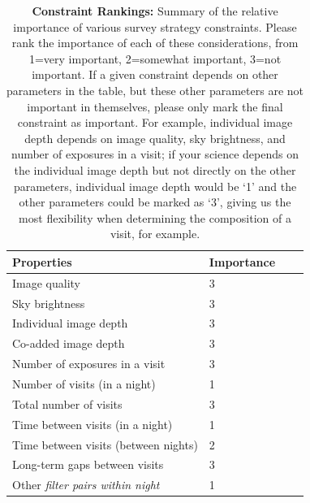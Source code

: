 \documentclass[12pt, letterpaper]{article}
\begin{document}
\begin{table}[ht]
    \centering
    \begin{tabular}{l|l|l|l}
        \toprule
        Properties & Importance \hspace{.3in} \\
        \midrule
        Image quality &   3  \\
        Sky brightness &  3\\
        Individual image depth & 3  \\
        Co-added image depth &   3\\
        Number of exposures in a visit   &  3 \\
        Number of visits (in a night)  &  1 \\ 
        Total number of visits &   3\\
        Time between visits (in a night) & 1 \\
        Time between visits (between nights)  & 2  \\
        Long-term gaps between visits & 3\\
        Other \emph{filter pairs within night} & 1 \\
        \bottomrule
    \end{tabular}
    \caption{{\bf Constraint Rankings:} Summary of the relative importance of various survey strategy constraints. Please rank the importance of each of these considerations, from 1=very important, 2=somewhat important, 3=not important. If a given constraint depends on other parameters in the table, but these other parameters are not important in themselves, please only mark the final constraint as important. For example, individual image depth depends on image quality, sky brightness, and number of exposures in a visit; if your science depends on the individual image depth but not directly on the other parameters, individual image depth would be `1' and the other parameters could be marked as `3', giving us the most flexibility when determining the composition of a visit, for example.}
        \label{tab:obs_constraints}
\end{table}
\end{document}
